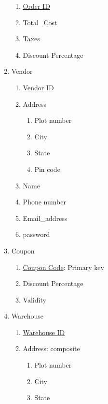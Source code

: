 \documentclass[12pt]{report}
\begin{document}
\begin{enumerate}
            \begin{enumerate}
                \item \underline{Order ID}
                \item Total\_Cost
                \item Taxes
                \item Discount Percentage
            \end{enumerate}
        \item Vendor
            \begin{enumerate}
                \item \underline{Vendor ID}
                \item Address
                    \begin{enumerate}
                        \item Plot number
                        \item City
                        \item State
                        \item Pin code
                    \end{enumerate}
                \item Name
                \item Phone number
                \item Email\_address
                \item password
            \end{enumerate}
        \item Coupon
            \begin{enumerate}
                \item \underline{Coupon Code}: Primary key
                \item Discount Percentage
                \item Validity
            \end{enumerate}
        \item Warehouse
            \begin{enumerate}
                \item \underline{Warehouse ID}
                \item Address: composite
                    \begin{enumerate}
                        \item Plot number
                        \item City
                        \item State

\end{enumerate}
\end{enumerate}
\end{enumerate}
\end{document}
